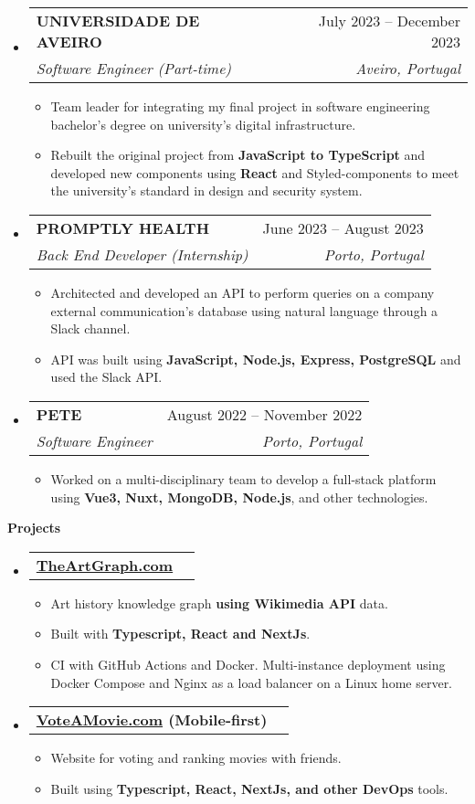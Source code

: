 \documentclass[letterpaper,12pt]{article}[leftmargin=*]
\makeatletter
\def \entryspacing {-4pt}
\renewcommand{\section}[2]{\vspace{5pt}
  \colorbox{secondary}{\color{white}\raggedbottom\normalsize\textbf{{#1}{\hspace{7pt}#2}}}
}
\newcommand{\resumeEntryStart}{\begin{itemize}[leftmargin=2.5mm]}
\newcommand{\resumeEntryEnd}{\end{itemize}\vspace{\entryspacing}}
\newcommand{\resumeItemListStart}{\begin{itemize}[leftmargin=4.5mm]}
\newcommand{\resumeItemListEnd}{\end{itemize}}
\newcommand{\resumeItem}[1]{
  \item\small{
    {#1 \vspace{-2pt}}
  }
}
\newcommand{\resumeEntryTSDL}[4]{
  \vspace{-1pt}\item[]
    \begin{tabularx}{0.97\textwidth}{X@{\hspace{60pt}}r}
      \textbf{\color{primary}#1} & {\firabook\color{accent}\small#2} \\
      \textit{\color{accent}\small#3} & \textit{\color{accent}\small#4} \\
    \end{tabularx}\vspace{-6pt}
}
\newcommand{\resumeEntryTD}[2]{
  \vspace{-1pt}\item[]
    \begin{tabularx}{0.97\textwidth}{X@{\hspace{60pt}}r}
      \textbf{\color{primary}#1} & {\firabook\color{accent}\small#2} \\
    \end{tabularx}\vspace{-6pt}
}
\makeatother
\begin{document}
  \resumeEntryStart
    \resumeEntryTSDL
      {UNIVERSIDADE DE AVEIRO}{July 2023 -- December 2023}
      {Software Engineer (Part-time)}{Aveiro, Portugal}
    \resumeItemListStart
      \resumeItem {Team leader for integrating my final project in software engineering bachelor's degree on university's digital infrastructure.}
      \resumeItem {Rebuilt the original project from \textbf{JavaScript to TypeScript} and developed new components using \textbf{React} and Styled-components to meet the university's standard in design and security system.}
    \resumeItemListEnd
  \resumeEntryEnd

  \resumeEntryStart
    \resumeEntryTSDL
      {PROMPTLY HEALTH}{June 2023 -- August 2023}
      {Back End Developer (Internship)}{Porto, Portugal}
    \resumeItemListStart
      \resumeItem {Architected and developed an API to perform queries on a company external communication's database using natural language through a Slack channel.}
      \resumeItem {API was built using \textbf{JavaScript, Node.js, Express, PostgreSQL} and used the Slack API.}
    \resumeItemListEnd
  \resumeEntryEnd

  \resumeEntryStart
    \resumeEntryTSDL
      {PETE}{August 2022 -- November 2022}
      {Software Engineer}{Porto, Portugal}
    \resumeItemListStart
      \resumeItem {Worked on a multi-disciplinary team to develop a full-stack platform using \textbf{Vue3, Nuxt, MongoDB, Node.js}, and other technologies.}
    \resumeItemListEnd
  \resumeEntryEnd
\section{\faFlask}{Projects}

  \resumeEntryStart
    \resumeEntryTD
      {\href{https://TheArtGraph.com}{TheArtGraph.com}}{}
    \resumeItemListStart
      \resumeItem {Art history knowledge graph \textbf{using Wikimedia API} data.}
      \resumeItem {Built with \textbf{Typescript, React and NextJs}.}
      \resumeItem {CI with GitHub Actions and Docker. Multi-instance deployment using Docker Compose and Nginx as a load balancer on a Linux home server.}
    \resumeItemListEnd
  \resumeEntryEnd

  \resumeEntryStart
    \resumeEntryTD
      {\href{https://VoteAMovie.com}{VoteAMovie.com} (Mobile-first)}{}
    \resumeItemListStart
      \resumeItem {Website for voting and ranking movies with friends.}
      \resumeItem {Built using \textbf{Typescript, React, NextJs, and other DevOps} tools.}
    \resumeItemListEnd
  \resumeEntryEnd
\end{document}
